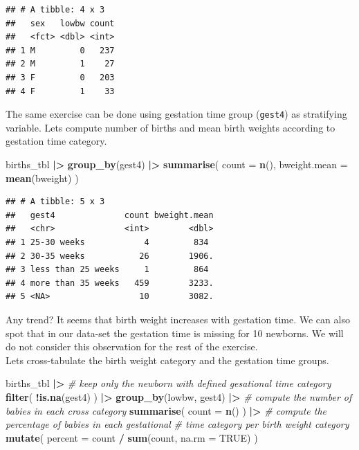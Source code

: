 \documentclass[
]{book}
\newenvironment{Shaded}{\begin{snugshade}}{\end{snugshade}}
\newcommand{\AttributeTok}[1]{\textcolor[rgb]{0.13,0.29,0.53}{#1}}
\newcommand{\CommentTok}[1]{\textcolor[rgb]{0.56,0.35,0.01}{\textit{#1}}}
\newcommand{\ConstantTok}[1]{\textcolor[rgb]{0.56,0.35,0.01}{#1}}
\newcommand{\FunctionTok}[1]{\textcolor[rgb]{0.13,0.29,0.53}{\textbf{#1}}}
\newcommand{\NormalTok}[1]{#1}
\newcommand{\SpecialCharTok}[1]{\textcolor[rgb]{0.81,0.36,0.00}{\textbf{#1}}}
\begin{document}
\begin{verbatim}
## # A tibble: 4 x 3
##   sex   lowbw count
##   <fct> <dbl> <int>
## 1 M         0   237
## 2 M         1    27
## 3 F         0   203
## 4 F         1    33
\end{verbatim}

The same exercise can be done using gestation time group (\texttt{gest4}) as stratifying variable.
Lets compute number of births and mean birth weights according to gestation time category.

\begin{Shaded}
\begin{Highlighting}[]
\NormalTok{births\_tbl }\SpecialCharTok{|\textgreater{}}
  \FunctionTok{group\_by}\NormalTok{(gest4) }\SpecialCharTok{|\textgreater{}}
  \FunctionTok{summarise}\NormalTok{(}
    \AttributeTok{count =} \FunctionTok{n}\NormalTok{(),}
    \AttributeTok{bweight.mean =} \FunctionTok{mean}\NormalTok{(bweight)}
\NormalTok{  )}
\end{Highlighting}
\end{Shaded}

\begin{verbatim}
## # A tibble: 5 x 3
##   gest4              count bweight.mean
##   <chr>              <int>        <dbl>
## 1 25-30 weeks            4         834 
## 2 30-35 weeks           26        1906.
## 3 less than 25 weeks     1         864 
## 4 more than 35 weeks   459        3233.
## 5 <NA>                  10        3082.
\end{verbatim}

Any trend?
It seems that birth weight increases with gestation time.
We can also spot that in our data-set the gestation time is missing for 10 newborns.
We will do not consider this observation for the rest of the exercise.\\
Lets cross-tabulate the birth weight category and the gestation time groups.

\begin{Shaded}
\begin{Highlighting}[]
\NormalTok{births\_tbl }\SpecialCharTok{|\textgreater{}}
  \CommentTok{\# keep only the newborn with defined gesational time category}
  \FunctionTok{filter}\NormalTok{(}
    \SpecialCharTok{!}\FunctionTok{is.na}\NormalTok{(gest4)}
\NormalTok{  ) }\SpecialCharTok{|\textgreater{}}
  \FunctionTok{group\_by}\NormalTok{(lowbw, gest4) }\SpecialCharTok{|\textgreater{}}
  \CommentTok{\# compute the number of babies in each cross category}
  \FunctionTok{summarise}\NormalTok{(}
    \AttributeTok{count =} \FunctionTok{n}\NormalTok{()}
\NormalTok{  ) }\SpecialCharTok{|\textgreater{}}
  \CommentTok{\# compute the percentage of babies in each gestational }
  \CommentTok{\# time category per birth weight category}
  \FunctionTok{mutate}\NormalTok{(}
    \AttributeTok{percent =}\NormalTok{ count }\SpecialCharTok{/} \FunctionTok{sum}\NormalTok{(count, }\AttributeTok{na.rm =} \ConstantTok{TRUE}\NormalTok{)}
\NormalTok{  )}
\end{Highlighting}
\end{Shaded}
\end{document}

